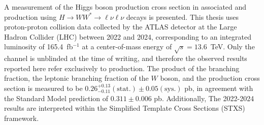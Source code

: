 A measurement of the Higgs boson production cross section in associated \wh{} and \zh{} production using $H \to WW^{*} \to \ell\nu\ell\nu$ decays is presented. This thesis uses proton-proton collision data collected by the ATLAS detector at the Large Hadron Collider (LHC) between 2022 and 2024, corresponding to an integrated luminosity of 165.4~fb$^{-1}$ at a center-of-mass energy of $\sqrt{s} = 13.6$~TeV. Only the \wh{} channel is unblinded at the time of writing, and therefore the observed results reported here refer exclusively to \wh{} production. The product of the \hww{} branching fraction, the leptonic branching fraction of the $W$ boson, and the \wh{} production cross section is measured to be $0.26^{+0.13}_{-0.11}(\text{stat.})\pm{0.05}(\text{sys.})$ pb, in agreement with the Standard Model prediction of $0.311\pm0.006$ pb. Additionally, The 2022-2024 results are interpreted within the Simplified Template Cross Sections (STXS) framework.